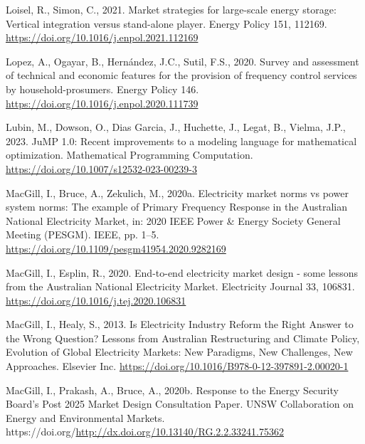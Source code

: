 \documentclass[12pt,a4paper,]{report}
\newlength{\cslhangindent}
\newenvironment{CSLReferences}[2] %
 {%
  \setlength{\parindent}{0pt}
  \ifodd #1 \everypar{\setlength{\hangindent}{\cslhangindent}}\ignorespaces\fi
  \ifnum #2 > 0
  \setlength{\parskip}{#2\baselineskip}
  \fi
 }%
 {}
\begin{document}
\begin{CSLReferences}{1}{0}
\leavevmode{}%
Loisel, R., Simon, C., 2021. Market strategies for large-scale energy
storage: {Vertical} integration versus stand-alone player. Energy Policy
151, 112169. \url{https://doi.org/10.1016/j.enpol.2021.112169}

\leavevmode{}%
Lopez, A., Ogayar, B., Hernández, J.C., Sutil, F.S., 2020. Survey and
assessment of technical and economic features for the provision of
frequency control services by household-prosumers. Energy Policy 146.
\url{https://doi.org/10.1016/j.enpol.2020.111739}

\leavevmode{}%
Lubin, M., Dowson, O., Dias Garcia, J., Huchette, J., Legat, B., Vielma,
J.P., 2023. {JuMP} 1.0: {Recent} improvements to a modeling language for
mathematical optimization. Mathematical Programming Computation.
\url{https://doi.org/10.1007/s12532-023-00239-3}

\leavevmode{}%
MacGill, I., Bruce, A., Zekulich, M., 2020a. Electricity market norms vs
power system norms: The example of {Primary Frequency Response} in the
{Australian National Electricity Market}, in: 2020 {IEEE Power} \&
{Energy Society General Meeting} ({PESGM}). IEEE, pp. 1--5.
\url{https://doi.org/10.1109/pesgm41954.2020.9282169}

\leavevmode{}%
MacGill, I., Esplin, R., 2020. End-to-end electricity market design -
some lessons from the {Australian National Electricity Market}.
Electricity Journal 33, 106831.
\url{https://doi.org/10.1016/j.tej.2020.106831}

\leavevmode{}%
MacGill, I., Healy, S., 2013. Is {Electricity Industry Reform} the
{Right Answer} to the {Wrong Question}? {Lessons} from {Australian
Restructuring} and {Climate Policy}, Evolution of Global Electricity
Markets: New Paradigms, New Challenges, New Approaches. Elsevier Inc.
\url{https://doi.org/10.1016/B978-0-12-397891-2.00020-1}

\leavevmode{}%
MacGill, I., Prakash, A., Bruce, A., 2020b. Response to the {Energy
Security Board}'s {Post} 2025 {Market Design Consultation Paper}. {UNSW
Collaboration on Energy and Environmental Markets}.
https://doi.org/\url{http://dx.doi.org/10.13140/RG.2.2.33241.75362}


\end{CSLReferences}
\end{document}
